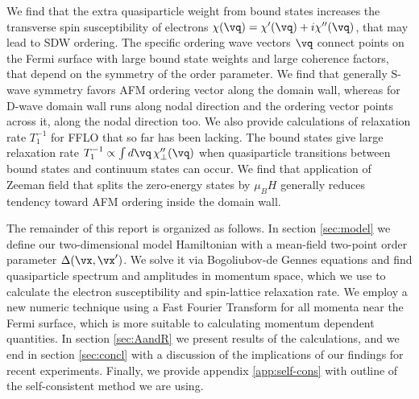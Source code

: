 \documentclass[prb,aps,showpacs,amsmath,twocolumn,10pt]{revtex4-1}
\begin{document}

We find that the extra quasiparticle weight from bound states increases the transverse spin susceptibility of
electrons $\chi(\vq) = \chi'(\vq)+ i\chi''(\vq)$, that may lead to SDW
ordering. %
The specific ordering wave vectors $\vq$ connect points on the Fermi surface
with large bound state weights and large coherence factors, 
that depend on the symmetry of the order parameter. 
We find that generally S-wave symmetry favors AFM ordering vector along the
domain wall, whereas for D-wave domain wall runs along nodal direction and the 
ordering vector points across it, along the nodal direction too. 
We also provide calculations of relaxation rate $T_1^{-1}$ for FFLO that so
far has been lacking. 
The bound states give large relaxation rate $T_1^{-1}\propto \int d\vq \,\chi''_{\perp}(\vq)$ 
when quasiparticle transitions between bound states %
and continuum states can occur. 
We find that application of Zeeman field that splits the zero-energy states by $\mu_B H$ 
generally reduces tendency toward AFM ordering inside the domain wall. 


The remainder of this report is organized as follows. In section
\ref{sec:model} we define our two-dimensional model Hamiltonian 
with a mean-field two-point order parameter $\Delta(\vx,\vx')$. 
We solve it via Bogoliubov-de Gennes equations and find quasiparticle spectrum and
amplitudes in momentum space, which we use to calculate the electron susceptibility 
and spin-lattice relaxation rate. We employ a new numeric
technique using a Fast Fourier Transform for all momenta near the Fermi surface, which is more suitable to calculating
momentum dependent quantities. 
In section \ref{sec:AandR} we present results of the calculations, and we end
in section \ref{sec:concl} with a discussion of the implications of our findings for recent experiments. 
Finally, we provide appendix \ref{app:self-cons} with outline of the self-consistent 
method we are using.
\end{document}
